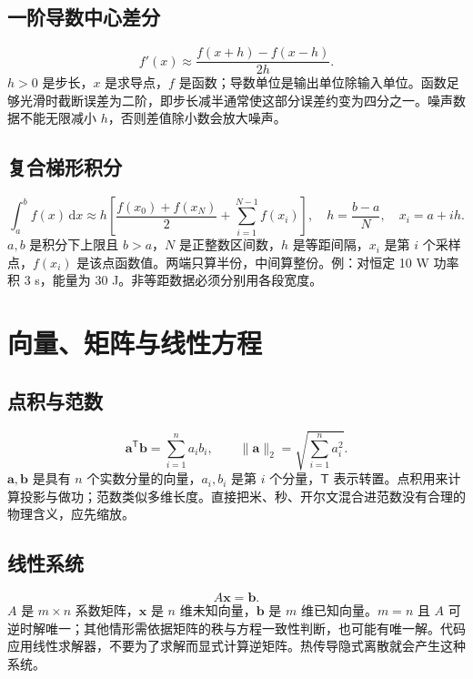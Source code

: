 \subsection{一阶导数中心差分}
\begin{equation}f'(x)\approx\frac{f(x+h)-f(x-h)}{2h}.\end{equation}
$h>0$ 是步长，$x$ 是求导点，$f$ 是函数；导数单位是输出单位除输入单位。函数足够光滑时截断误差为二阶，即步长减半通常使这部分误差约变为四分之一。噪声数据不能无限减小 $h$，否则差值除小数会放大噪声。
\subsection{复合梯形积分}
\begin{equation}\int_a^b f(x)\,\mathrm dx\approx h\left[\frac{f(x_0)+f(x_N)}2+\sum_{i=1}^{N-1}f(x_i)\right],\quad h=\frac{b-a}{N},\quad x_i=a+ih.\end{equation}
$a,b$ 是积分下上限且 $b>a$，$N$ 是正整数区间数，$h$ 是等距间隔，$x_i$ 是第 $i$ 个采样点，$f(x_i)$ 是该点函数值。两端只算半份，中间算整份。例：对恒定 10 W 功率积 3 s，能量为 30 J。非等距数据必须分别用各段宽度。

\section{向量、矩阵与线性方程}
\subsection{点积与范数}
\begin{equation}\boldsymbol a^\mathsf T\boldsymbol b=\sum_{i=1}^n a_i b_i,\qquad \|\boldsymbol a\|_2=\sqrt{\sum_{i=1}^n a_i^2}.\end{equation}
$\boldsymbol a,\boldsymbol b$ 是具有 $n$ 个实数分量的向量，$a_i,b_i$ 是第 $i$ 个分量，$\mathsf T$ 表示转置。点积用来计算投影与做功；范数类似多维长度。直接把米、秒、开尔文混合进范数没有合理的物理含义，应先缩放。
\subsection{线性系统}
\begin{equation}A\boldsymbol x=\boldsymbol b.\end{equation}
$A$ 是 $m\times n$ 系数矩阵，$\boldsymbol x$ 是 $n$ 维未知向量，$\boldsymbol b$ 是 $m$ 维已知向量。$m=n$ 且 $A$ 可逆时解唯一；其他情形需依据矩阵的秩与方程一致性判断，也可能有唯一解。代码应用线性求解器，不要为了求解而显式计算逆矩阵。热传导隐式离散就会产生这种系统。
